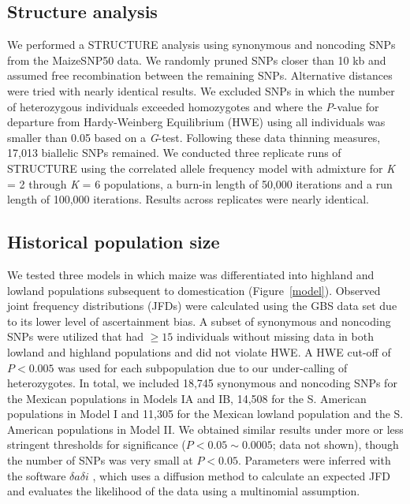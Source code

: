 \subsection*{Structure analysis}
We performed a {\sf STRUCTURE} analysis \cite[]{Pritchard_2000_10835412,Falush_2003_12930761} using synonymous and noncoding SNPs from the MaizeSNP50 data. 
We randomly pruned SNPs closer than 10 kb and assumed free recombination between the remaining SNPs.
Alternative distances were tried with nearly identical results. 
We excluded SNPs in which the number of heterozygous individuals exceeded homozygotes and where the \emph{P}-value for departure from Hardy-Weinberg Equilibrium (HWE) using all individuals was smaller than 0.05 based on a \emph{G}-test. 
Following these data thinning measures, 17,013 biallelic SNPs remained. 
We conducted three replicate runs of {\sf STRUCTURE} using the correlated allele frequency model with admixture for \emph{K} = 2 through \emph{K} = 6 populations, a burn-in length of 50,000 iterations and a run length of 100,000 iterations. 
Results across replicates were nearly identical.

\subsection*{Historical population size}
We tested three models in which maize was differentiated into highland and lowland populations subsequent to domestication (Figure~\ref{model}). 
Observed joint frequency distributions (JFDs) were calculated using the GBS data set due to its lower level of ascertainment bias. 
A subset of synonymous and noncoding SNPs were utilized that had $\geq15$ individuals without missing data in both lowland and highland populations and did not violate HWE.  
A HWE cut-off of $P<0.005$ was used for each subpopulation due to our under-calling of heterozygotes. 
In total, we included 18,745 synonymous and noncoding SNPs for the Mexican populations in Models IA and IB, 14,508 for the S. American populations in Model I and 11,305 for the Mexican lowland population and the S. American populations in Model II.  
We obtained similar results under more or less stringent thresholds for significance ($P < 0.05 \sim 0.0005$; data not shown), though the number of SNPs was very small at $P<0.05$.  
Parameters were inferred with the software $\delta a \delta i$ \cite[]{Gutenkunst_2009_19851460}, which uses a diffusion method to calculate an expected JFD and evaluates the likelihood of the data using a multinomial assumption. 

